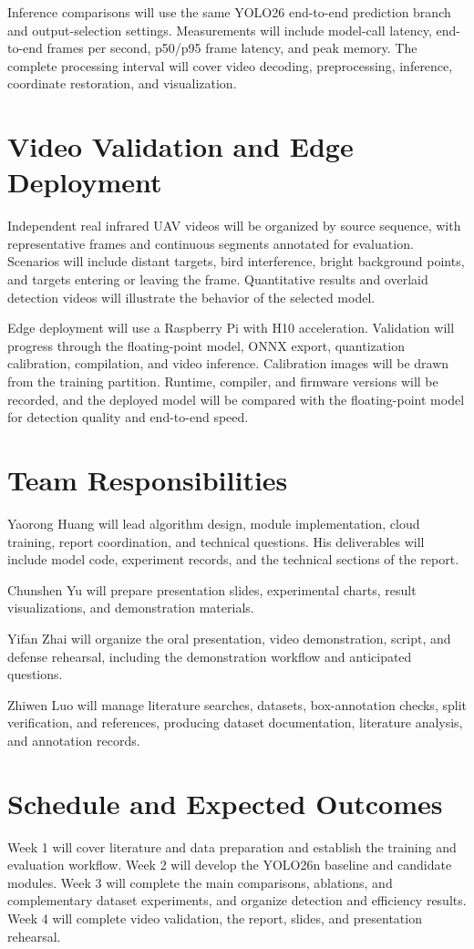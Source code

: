 Inference comparisons will use the same YOLO26 end-to-end prediction branch and output-selection settings. Measurements will include model-call latency, end-to-end frames per second, p50/p95 frame latency, and peak memory. The complete processing interval will cover video decoding, preprocessing, inference, coordinate restoration, and visualization.

\section{Video Validation and Edge Deployment}
Independent real infrared UAV videos will be organized by source sequence, with representative frames and continuous segments annotated for evaluation. Scenarios will include distant targets, bird interference, bright background points, and targets entering or leaving the frame. Quantitative results and overlaid detection videos will illustrate the behavior of the selected model.

Edge deployment will use a Raspberry Pi with H10 acceleration. Validation will progress through the floating-point model, ONNX export, quantization calibration, compilation, and video inference. Calibration images will be drawn from the training partition. Runtime, compiler, and firmware versions will be recorded, and the deployed model will be compared with the floating-point model for detection quality and end-to-end speed.

\section{Team Responsibilities}
Yaorong Huang will lead algorithm design, module implementation, cloud training, report coordination, and technical questions. His deliverables will include model code, experiment records, and the technical sections of the report.

Chunshen Yu will prepare presentation slides, experimental charts, result visualizations, and demonstration materials.

Yifan Zhai will organize the oral presentation, video demonstration, script, and defense rehearsal, including the demonstration workflow and anticipated questions.

Zhiwen Luo will manage literature searches, datasets, box-annotation checks, split verification, and references, producing dataset documentation, literature analysis, and annotation records.

\section{Schedule and Expected Outcomes}
Week 1 will cover literature and data preparation and establish the training and evaluation workflow. Week 2 will develop the YOLO26n baseline and candidate modules. Week 3 will complete the main comparisons, ablations, and complementary dataset experiments, and organize detection and efficiency results. Week 4 will complete video validation, the report, slides, and presentation rehearsal.

